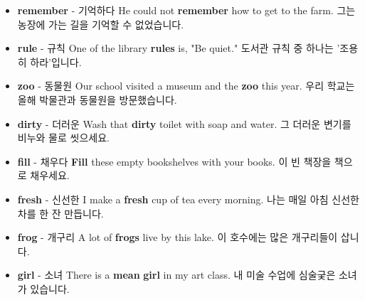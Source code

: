 \documentclass{article}
\begin{document}
\begin{addmargin}[1em]{1em}
\begin{itemize}
        \item \fontsize{12pt}{14pt}\selectfont \textbf{remember} - 기억하다 \newline
        He could not \textbf{remember} how to get to the farm. \newline
        그는 농장에 가는 길을 기억할 수 없었습니다.
        
        \item \fontsize{12pt}{14pt}\selectfont \textbf{rule} - 규칙 \newline
        One of the library \textbf{rules} is, "Be quiet." \newline
        도서관 규칙 중 하나는 '조용히 하라'입니다.
        
        \item \fontsize{12pt}{14pt}\selectfont \textbf{zoo} - 동물원 \newline
        Our school visited a museum and the \textbf{zoo} this year. \newline
        우리 학교는 올해 박물관과 동물원을 방문했습니다.
        
        \item \fontsize{12pt}{14pt}\selectfont \textbf{dirty} - 더러운 \newline
        Wash that \textbf{dirty} toilet with soap and water. \newline
        그 더러운 변기를 비누와 물로 씻으세요.
        
        \item \fontsize{12pt}{14pt}\selectfont \textbf{fill} - 채우다 \newline
        \textbf{Fill} these empty bookshelves with your books. \newline
        이 빈 책장을 책으로 채우세요.
        
        \item \fontsize{12pt}{14pt}\selectfont \textbf{fresh} - 신선한 \newline
        I make a \textbf{fresh} cup of tea every morning. \newline
        나는 매일 아침 신선한 차를 한 잔 만듭니다.
        
        \item \fontsize{12pt}{14pt}\selectfont \textbf{frog} - 개구리 \newline
        A lot of \textbf{frogs} live by this lake. \newline
        이 호수에는 많은 개구리들이 삽니다.
        
        \item \fontsize{12pt}{14pt}\selectfont \textbf{girl} - 소녀 \newline
        There is a \textbf{mean} \textbf{girl} in my art class. \newline
        내 미술 수업에 심술궂은 소녀가 있습니다.
        

\end{itemize}
\end{addmargin}
\end{document}
